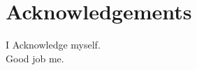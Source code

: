 


\bigskip


\begingroup

\let\clearpage\relax
\let\cleardoublepage\relax
\let\cleardoublepage\relax

\chapter*{Acknowledgements}

\noindent I Acknowledge myself. \\
Good job me.


\endgroup